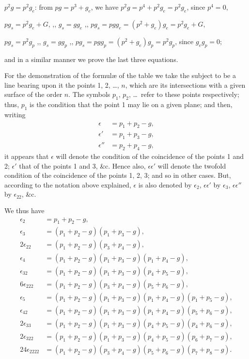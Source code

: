 \documentclass[11pt,a4paper]{book}
\begin{document}
$p^2g = p^2g_e$: from $pg = p^3 + g_e$, we have $p^2g = p^4 + p^2g_e = p^2g_e$, since $p^4 = 0$,

$pg_s = p^2g_e + G$, ,, \hspace{3em} $g_s = gg_e$ \hspace{3em} ,, \hspace{3em} $pg_s = pgg_e = (p^2 + g_e)g_e = p^2g_e + G$,

$pg_s = p^2g_p$ \hspace{1.5em} ,, \hspace{3em} $g_s = gg_p$ \hspace{3em} ,, \hspace{3em} $pg_s = pgg_p = (p^2 + g_e)g_p = p^2g_p$, since $g_eg_p = 0$;

and in a similar manner we prove the last three equations.

For the demonstration of the formul\ae{} of the table we take the subject to be a line bearing upon it the points 1, 2, \ldots, $n$, which are its intersections with a given surface of the order $n$. The symbols $p_1$, $p_2$, \ldots\ refer to these points respectively; thus, $p_1$ is the condition that the point 1 may lie on a given plane; and then, writing
\begin{align*}
\epsilon &= p_1 + p_2 - g, \\
\epsilon' &= p_1 + p_3 - g, \\
\epsilon'' &= p_2 + p_4 - g,
\end{align*}
it appears that $\epsilon$ will denote the condition of the coincidence of the points 1 and 2; $\epsilon'$ that of the points 1 and 3, \&c. Hence also, $\epsilon\epsilon'$ will denote the twofold condition of the coincidence of the points 1, 2, 3; and so in other cases. But, according to the notation above explained, $\epsilon$ is also denoted by $\epsilon_2$, $\epsilon\epsilon'$ by $\epsilon_3$, $\epsilon\epsilon''$ by $\epsilon_{22}$, \&c.

We thus have
\begin{align*}
\epsilon_2 &= p_1 + p_2 - g, \\
\epsilon_3 &= (p_1 + p_2 - g)(p_1 + p_3 - g), \\
2\epsilon_{22} &= (p_1 + p_2 - g)(p_3 + p_4 - g), \\
\epsilon_4 &= (p_1 + p_2 - g)(p_1 + p_3 - g)(p_1 + p_4 - g), \\
\epsilon_{32} &= (p_1 + p_2 - g)(p_1 + p_3 - g)(p_4 + p_5 - g), \\
6\epsilon_{222} &= (p_1 + p_2 - g)(p_3 + p_4 - g)(p_5 + p_6 - g), \\
\epsilon_5 &= (p_1 + p_2 - g)(p_1 + p_3 - g)(p_1 + p_4 - g)(p_1 + p_5 - g), \\
\epsilon_{42} &= (p_1 + p_2 - g)(p_1 + p_3 - g)(p_1 + p_4 - g)(p_5 + p_6 - g), \\
2\epsilon_{33} &= (p_1 + p_2 - g)(p_1 + p_3 - g)(p_4 + p_5 - g)(p_4 + p_6 - g), \\
2\epsilon_{322} &= (p_1 + p_2 - g)(p_1 + p_3 - g)(p_4 + p_5 - g)(p_6 + p_7 - g), \\
24\epsilon_{2222} &= (p_1 + p_2 - g)(p_3 + p_4 - g)(p_5 + p_6 - g)(p_7 + p_8 - g).
\end{align*}
\end{document}
